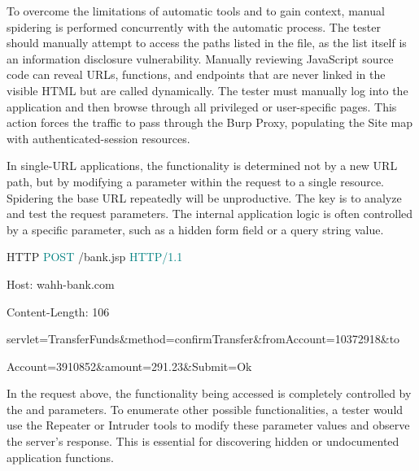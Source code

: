 To overcome the limitations of automatic tools and to gain context, manual spidering is performed concurrently with the automatic process. The tester should manually attempt to access the paths listed in the  file, as the list itself is an information disclosure vulnerability. Manually reviewing JavaScript source code can reveal URLs, functions, and endpoints that are never linked in the visible HTML but are called dynamically. The tester must manually log into the application and then browse through all privileged or user-specific pages. This action forces the traffic to pass through the Burp Proxy, populating the Site map with authenticated-session resources.

In single-URL applications, the functionality is determined not by a new URL path, but by modifying a parameter within the request to a single resource. Spidering the base URL repeatedly will be unproductive. The key is to analyze and test the request parameters. The internal application logic is often controlled by a specific parameter, such as a hidden form field or a query string value.

\begin{customcode}{HTTP}
    \textcolor{teal}{POST} /bank.jsp \textcolor{teal}{HTTP/1.1}

    \textcolor{RedOrange}{Host}: wahh-bank.com

    \textcolor{RedOrange}{Content-Length}: 106

    \textcolor{RedOrange}{servlet}=TransferFunds\&method=confirmTransfer\&fromAccount=10372918\&to

    \hspace{4em}Account=3910852\&amount=291.23\&Submit=Ok
\end{customcode}

In the request above, the functionality being accessed is completely controlled by the  and  parameters. To enumerate other possible functionalities, a tester would use the Repeater or Intruder tools to modify these parameter values and observe the server's response. This is essential for discovering hidden or undocumented application functions.